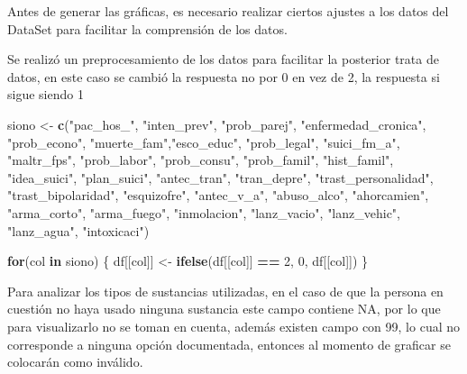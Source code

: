 \documentclass[
]{article}
\newenvironment{Shaded}{\begin{snugshade}}{\end{snugshade}}
\newcommand{\ControlFlowTok}[1]{\textcolor[rgb]{0.13,0.29,0.53}{\textbf{#1}}}
\newcommand{\DecValTok}[1]{\textcolor[rgb]{0.00,0.00,0.81}{#1}}
\newcommand{\FunctionTok}[1]{\textcolor[rgb]{0.13,0.29,0.53}{\textbf{#1}}}
\newcommand{\NormalTok}[1]{#1}
\newcommand{\OtherTok}[1]{\textcolor[rgb]{0.56,0.35,0.01}{#1}}
\newcommand{\SpecialCharTok}[1]{\textcolor[rgb]{0.81,0.36,0.00}{\textbf{#1}}}
\newcommand{\StringTok}[1]{\textcolor[rgb]{0.31,0.60,0.02}{#1}}
\begin{document}
Antes de generar las gráficas, es necesario realizar ciertos ajustes a
los datos del DataSet para facilitar la comprensión de los datos.

Se realizó un preprocesamiento de los datos para facilitar la posterior
trata de datos, en este caso se cambió la respuesta no por 0 en vez de
2, la respuesta si sigue siendo 1

\begin{Shaded}
\begin{Highlighting}[]
\NormalTok{siono }\OtherTok{\textless{}{-}} \FunctionTok{c}\NormalTok{(}\StringTok{"pac\_hos\_"}\NormalTok{, }\StringTok{"inten\_prev"}\NormalTok{, }\StringTok{"prob\_parej"}\NormalTok{, }\StringTok{"enfermedad\_cronica"}\NormalTok{, }\StringTok{"prob\_econo"}\NormalTok{, }\StringTok{"muerte\_fam"}\NormalTok{,}\StringTok{"esco\_educ"}\NormalTok{, }\StringTok{"prob\_legal"}\NormalTok{, }\StringTok{"suici\_fm\_a"}\NormalTok{, }\StringTok{"maltr\_fps"}\NormalTok{, }\StringTok{"prob\_labor"}\NormalTok{, }\StringTok{"prob\_consu"}\NormalTok{, }\StringTok{"prob\_famil"}\NormalTok{, }\StringTok{"hist\_famil"}\NormalTok{, }\StringTok{"idea\_suici"}\NormalTok{, }\StringTok{"plan\_suici"}\NormalTok{, }\StringTok{"antec\_tran"}\NormalTok{, }\StringTok{"tran\_depre"}\NormalTok{, }\StringTok{"trast\_personalidad"}\NormalTok{, }\StringTok{"trast\_bipolaridad"}\NormalTok{, }\StringTok{"esquizofre"}\NormalTok{, }\StringTok{"antec\_v\_a"}\NormalTok{, }\StringTok{"abuso\_alco"}\NormalTok{, }\StringTok{"ahorcamien"}\NormalTok{, }\StringTok{"arma\_corto"}\NormalTok{, }\StringTok{"arma\_fuego"}\NormalTok{, }\StringTok{"inmolacion"}\NormalTok{, }\StringTok{"lanz\_vacio"}\NormalTok{, }\StringTok{"lanz\_vehic"}\NormalTok{, }\StringTok{"lanz\_agua"}\NormalTok{, }\StringTok{"intoxicaci"}\NormalTok{)}

\ControlFlowTok{for}\NormalTok{(col }\ControlFlowTok{in}\NormalTok{ siono) \{}
\NormalTok{  df[[col]] }\OtherTok{\textless{}{-}} \FunctionTok{ifelse}\NormalTok{(df[[col]] }\SpecialCharTok{==} \DecValTok{2}\NormalTok{, }\DecValTok{0}\NormalTok{, df[[col]])}
\NormalTok{\}}
\end{Highlighting}
\end{Shaded}

Para analizar los tipos de sustancias utilizadas, en el caso de que la
persona en cuestión no haya usado ninguna sustancia este campo contiene
NA, por lo que para visualizarlo no se toman en cuenta, además existen
campo con 99, lo cual no corresponde a ninguna opción documentada,
entonces al momento de graficar se colocarán como inválido.
\end{document}
